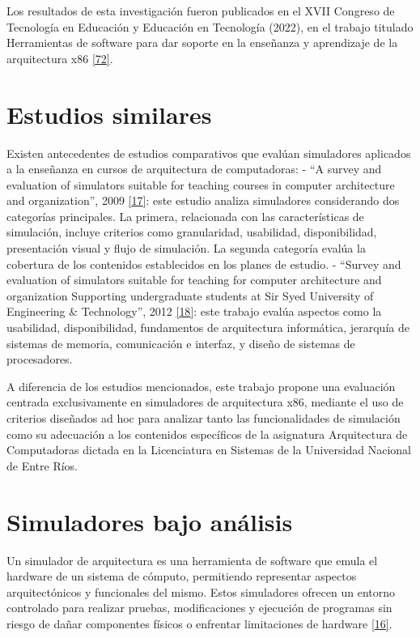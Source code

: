 \documentclass[12pt,oneside]{templates/unerthesis}
\begin{document}
Los resultados de esta investigación fueron publicados en el XVII Congreso de Tecnología en Educación y Educación en Tecnología (2022), en el trabajo titulado Herramientas de software para dar soporte en la enseñanza y aprendizaje de la arquitectura x86 \protect\hyperlink{ref-colombani_herramientas_2022}{{[}72{]}}.

\hypertarget{estudios-similares}{%
\section{Estudios similares}\label{estudios-similares}}

Existen antecedentes de estudios comparativos que evalúan simuladores aplicados a la enseñanza en cursos de arquitectura de computadoras:
- ``A survey and evaluation of simulators suitable for teaching courses in computer architecture and organization'', 2009 \protect\hyperlink{ref-nikolic_survey_2009}{{[}17{]}}: este estudio analiza simuladores considerando dos categorías principales. La primera, relacionada con las características de simulación, incluye criterios como granularidad, usabilidad, disponibilidad, presentación visual y flujo de simulación. La segunda categoría evalúa la cobertura de los contenidos establecidos en los planes de estudio.
- ``Survey and evaluation of simulators suitable for teaching for computer architecture and organization Supporting undergraduate students at Sir Syed University of Engineering \& Technology'', 2012 \protect\hyperlink{ref-hasan_survey_2012}{{[}18{]}}: este trabajo evalúa aspectos como la usabilidad, disponibilidad, fundamentos de arquitectura informática, jerarquía de sistemas de memoria, comunicación e interfaz, y diseño de sistemas de procesadores.

A diferencia de los estudios mencionados, este trabajo propone una evaluación centrada exclusivamente en simuladores de arquitectura x86, mediante el uso de criterios diseñados ad hoc para analizar tanto las funcionalidades de simulación como su adecuación a los contenidos específicos de la asignatura Arquitectura de Computadoras dictada en la Licenciatura en Sistemas de la Universidad Nacional de Entre Ríos.

\hypertarget{simuladores-bajo-anuxe1lisis}{%
\section{Simuladores bajo análisis}\label{simuladores-bajo-anuxe1lisis}}

Un simulador de arquitectura es una herramienta de software que emula el hardware de un sistema de cómputo, permitiendo representar aspectos arquitectónicos y funcionales del mismo. Estos simuladores ofrecen un entorno controlado para realizar pruebas, modificaciones y ejecución de programas sin riesgo de dañar componentes físicos o enfrentar limitaciones de hardware \protect\hyperlink{ref-radivojevic_design_2011}{{[}16{]}}.
\end{document}
